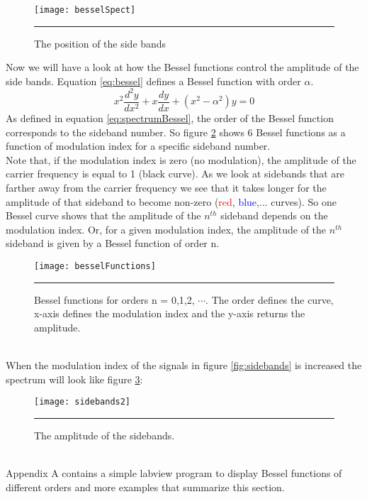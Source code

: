 \begin{figure}[htbp]
\centering
\texttt{[image: besselSpect]}
\rule{30em}{0.5pt}
\caption{The position of the side bands}
\label{fig:besselFreq}
\end{figure}
Now we will have a look at how the Bessel functions control the amplitude of the side bands. Equation \ref{eq:bessel} defines a Bessel function with order $\alpha$.
\begin{equation}
x^{2} \frac{d^{2}y}{dx^{2}} + x\frac{dy}{dx} + (x^{2}-\alpha^{2})y = 0
\label{eq:bessel}
\end{equation}
As defined in equation \ref{eq:spectrumBessel}, the order of the Bessel function corresponds to the sideband number.  So figure \ref{fig:besselFunctions} shows 6 Bessel functions as a function of modulation index for a specific sideband number. \\
Note that, if the modulation index is zero (no modulation), the amplitude of the carrier frequency is equal to 1 (black curve). As we look at sidebands that are farther away from the carrier frequency we see that it takes longer for the amplitude of that sideband to become non-zero (\textcolor{red}{red}, \textcolor{blue}{blue},... curves). So one Bessel curve shows that the amplitude of the $n^{th}$ sideband depends on the modulation index. Or, for a given modulation index, the amplitude of the $n^{th}$ sideband is given by a Bessel function of order n.
\begin{figure}[htbp]
\centering
\texttt{[image: besselFunctions]}
\rule{30em}{0.5pt}
\caption[Bessel functions for orders n = 0,1,2, $\cdots$]{Bessel functions for orders n = 0,1,2, $\cdots$. The order defines the curve, x-axis defines the modulation index and the y-axis returns the amplitude.}
\label{fig:besselFunctions}
\end{figure}\\
When the modulation index of the signals in figure \ref{fig:sidebands} is increased the spectrum will look like figure \ref{fig:sidebands2}:
\begin{figure}[htbp]
\centering
\texttt{[image: sidebands2]}
\rule{30em}{0.5pt}
\caption{The amplitude of the sidebands.}
\label{fig:sidebands2}
\end{figure}\\
Appendix A contains a simple labview program to display Bessel functions of different orders and more examples that summarize this section.\\
